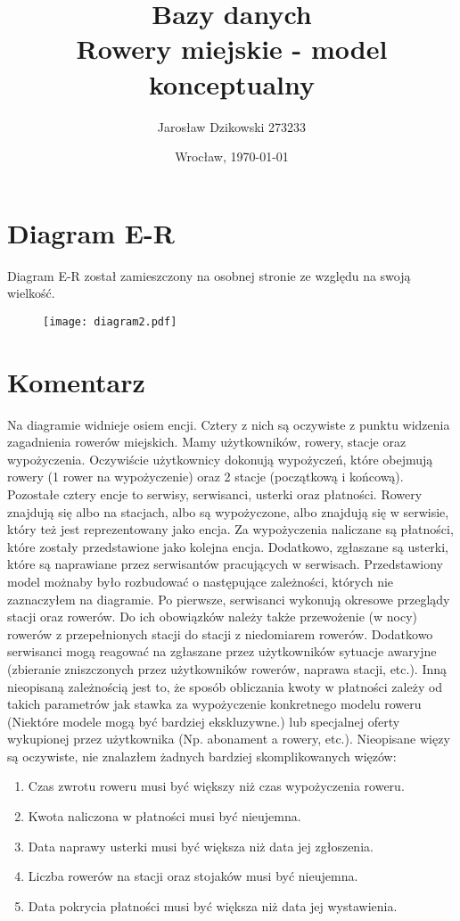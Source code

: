 \documentclass{article}
\author{Jarosław Dzikowski 273233}
\date{Wrocław, \today}
\title{\textbf{Bazy danych} \\ Rowery miejskie - model konceptualny}
\begin{document}
\maketitle

\section{Diagram E-R}
Diagram E-R został zamieszczony na osobnej stronie ze względu na swoją wielkość.
\begin{figure}[p]
\centerline{	\texttt{[image: diagram2.pdf]}}
\end{figure}

\section{Komentarz}
Na diagramie widnieje osiem encji. Cztery z nich są oczywiste z punktu widzenia zagadnienia rowerów miejskich. Mamy użytkowników, rowery, stacje oraz wypożyczenia. Oczywiście użytkownicy dokonują wypożyczeń, które obejmują rowery (1 rower na wypożyczenie) oraz 2 stacje (początkową i końcową). Pozostałe cztery encje to serwisy, serwisanci, usterki oraz płatności. Rowery znajdują się albo na stacjach, albo są wypożyczone, albo znajdują się w serwisie, który też jest reprezentowany jako encja. Za wypożyczenia naliczane są płatności, które zostały przedstawione jako kolejna encja. Dodatkowo, zgłaszane są usterki, które są naprawiane przez serwisantów pracujących w serwisach.\newline
\newline
Przedstawiony model możnaby było rozbudować o następujące zależności, których nie zaznaczyłem na diagramie. Po pierwsze, serwisanci wykonują okresowe przeglądy stacji oraz rowerów. Do ich obowiązków należy także przewożenie (w nocy) rowerów z przepełnionych stacji do stacji z niedomiarem rowerów. Dodatkowo serwisanci mogą reagować na zgłaszane przez użytkowników sytuacje awaryjne (zbieranie zniszczonych przez użytkowników rowerów, naprawa stacji, etc.). Inną nieopisaną zależnością jest to, że sposób obliczania kwoty w płatności zależy od takich parametrów jak stawka za wypożyczenie konkretnego modelu roweru (Niektóre modele mogą być bardziej ekskluzywne.) lub specjalnej oferty wykupionej przez użytkownika (Np. abonament a rowery, etc.).
\newline
\newline
Nieopisane więzy są oczywiste, nie znalazłem żadnych bardziej skomplikowanych więzów:
\begin{enumerate}
	\item Czas zwrotu roweru musi być większy niż czas wypożyczenia roweru.
	\item Kwota naliczona w płatności musi być nieujemna.
	\item Data naprawy usterki musi być większa niż data jej zgłoszenia.
	\item Liczba rowerów na stacji oraz stojaków musi być nieujemna.
	\item Data pokrycia płatności musi być większa niż data jej wystawienia.
\end{enumerate}
\end{document}
